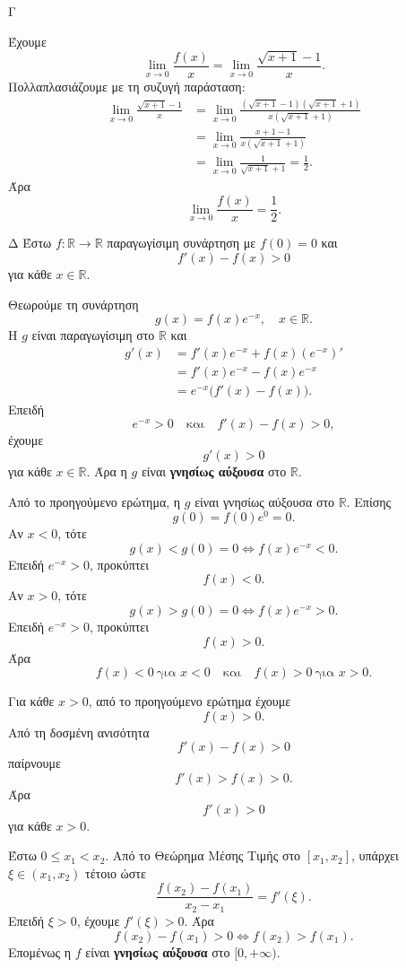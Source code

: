 \begin{thema}{Γ}
\begin{erwthma}
\item Έχουμε
\[
\lim_{x\to0}\frac{f(x)}{x}
=\lim_{x\to0}\frac{\sqrt{x+1}-1}{x}.
\]
Πολλαπλασιάζουμε με τη συζυγή παράσταση:
\begin{align*}
\lim_{x\to0}\frac{\sqrt{x+1}-1}{x}
&=\lim_{x\to0}
\frac{(\sqrt{x+1}-1)(\sqrt{x+1}+1)}{x(\sqrt{x+1}+1)}\\
&=\lim_{x\to0}\frac{x+1-1}{x(\sqrt{x+1}+1)}\\
&=\lim_{x\to0}\frac{1}{\sqrt{x+1}+1}
=\frac{1}{2}.
\end{align*}
Άρα
\[
{\lim_{x\to0}\frac{f(x)}{x}=\frac{1}{2}}.
\]
\end{erwthma}
\end{thema}

\begin{thema}{Δ}
Έστω $f:\mathbb{R}\to\mathbb{R}$ παραγωγίσιμη συνάρτηση με $f(0)=0$ και
\[
f'(x)-f(x)>0
\]
για κάθε $x\in\mathbb{R}$.
\begin{erwthma}
\item Θεωρούμε τη συνάρτηση
\[
g(x)=f(x)e^{-x},\quad x\in\mathbb{R}.
\]
Η $g$ είναι παραγωγίσιμη στο $\mathbb{R}$ και
\begin{align*}
g'(x)&=f'(x)e^{-x}+f(x)(e^{-x})'\\
&=f'(x)e^{-x}-f(x)e^{-x}\\
&=e^{-x}\bigl(f'(x)-f(x)\bigr).
\end{align*}
Επειδή
\[
e^{-x}>0
\quad\text{και}\quad
f'(x)-f(x)>0,
\]
έχουμε
\[
g'(x)>0
\]
για κάθε $x\in\mathbb{R}$. Άρα η $g$ είναι \textbf{γνησίως αύξουσα} στο $\mathbb{R}$.

\item Από το προηγούμενο ερώτημα, η $g$ είναι γνησίως αύξουσα στο $\mathbb{R}$. Επίσης
\[
g(0)=f(0)e^0=0.
\]
Αν $x<0$, τότε
\[
g(x)<g(0)=0
\Leftrightarrow f(x)e^{-x}<0.
\]
Επειδή $e^{-x}>0$, προκύπτει
\[
f(x)<0.
\]
Αν $x>0$, τότε
\[
g(x)>g(0)=0
\Leftrightarrow f(x)e^{-x}>0.
\]
Επειδή $e^{-x}>0$, προκύπτει
\[
f(x)>0.
\]
Άρα
\[
{f(x)<0\ \text{για }x<0}
\quad\text{και}\quad
{f(x)>0\ \text{για }x>0}.
\]

\item Για κάθε $x>0$, από το προηγούμενο ερώτημα έχουμε
\[
f(x)>0.
\]
Από τη δοσμένη ανισότητα
\[
f'(x)-f(x)>0
\]
παίρνουμε
\[
f'(x)>f(x)>0.
\]
Άρα
\[
f'(x)>0
\]
για κάθε $x>0$.

Έστω $0\leq x_1<x_2$. Από το Θεώρημα Μέσης Τιμής στο $[x_1,x_2]$, υπάρχει $\xi\in(x_1,x_2)$ τέτοιο ώστε
\[
\frac{f(x_2)-f(x_1)}{x_2-x_1}=f'(\xi).
\]
Επειδή $\xi>0$, έχουμε $f'(\xi)>0$. Άρα
\[
f(x_2)-f(x_1)>0
\Leftrightarrow f(x_2)>f(x_1).
\]
Επομένως η $f$ είναι \textbf{γνησίως αύξουσα} στο $[0,+\infty)$.


\end{erwthma}
\end{thema}

